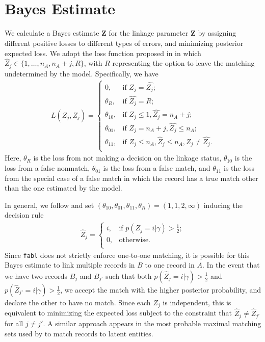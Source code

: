 \documentclass[ba,preprint]{imsart}
\begin{document}
	\hypertarget{bayes-estimate}{%
		\section{Bayes Estimate}
		\label{bayes-estimate}}
	
We calculate a Bayes estimate $\hat{\bm{Z}}$ for the linkage parameter $\bm{Z}$ by assigning different positive losses to different types of errors, and minimizing posterior expected loss. We adopt the loss function proposed in \cite{sadinle_bayesian_2017} in which $\hat{Z}_j \in \{1, \ldots, n_A, n_A + j, R\}$, with $R$ representing the option to leave the matching undetermined by the model. Specifically, we have
\begin{align}
	L(\hat{Z_j}, Z_j)=\begin{cases} 
		0,  & \text{if } Z_j = \hat{Z_j}; \\
		\theta_R,  & \text{if } \hat{Z_j} = R; \\
		\theta_{10},  & \text{if } Z_j \leq 1,\hat{Z_j} = n_A + j ; \\
		\theta_{01},  & \text{if } Z_j = n_A + j,\hat{Z_j} \leq n_A ; \\
		\theta_{11},  & \text{if } Z_j \leq n_A, \hat{Z}_j \leq n_A, Z_j \neq \hat{Z_j}. \\
	\end{cases}
\end{align}
Here, $\theta_R$ is the loss from not making a decision on the linkage status, $\theta_{10}$ is the loss from a false nonmatch, $\theta_{01}$ is the loss from a false match, and $\theta_{11}$ is the loss from the special case of a false match in which the record has a true match other than the one estimated by the model. 

In general, we follow \cite{sadinle_bayesian_2017} and set $(\theta_{10}, \theta_{01}, \theta_{11}, \theta_R) = (1, 1, 2, \infty)$ inducing the decision rule
	\begin{align}
		\hat{Z}_j =\begin{cases} 
		i,  & \text{if } p(Z_j = i |\gamma) > \frac{1}{2}; \\
		0,  & \text{otherwise}. \\
	\end{cases}
\end{align}
Since \texttt{fabl} does not strictly enforce one-to-one matching, it is possible for this Bayes estimate to link multiple records in $B$ to one record in $A$. In the event that we have two records $B_j$ and $B_{j'}$ such that both $p(\hat{Z}_j = i |\gamma) > \frac{1}{2}$ and $ p(\hat{Z}_{j'} = i |\gamma) > \frac{1}{2}$, we accept the match with the higher posterior probability, and declare the other to have no match. Since each $Z_j$ is independent, this is equivalent to minimizing the expected loss subject to the constraint that $\hat{Z}_j \neq \hat{Z}_{j'}$ for all $j \neq j'$.  A similar approach appears in the most probable maximal matching sets used by \cite{steorts_bayesian_2016} to match records to latent entities.
\end{document}
